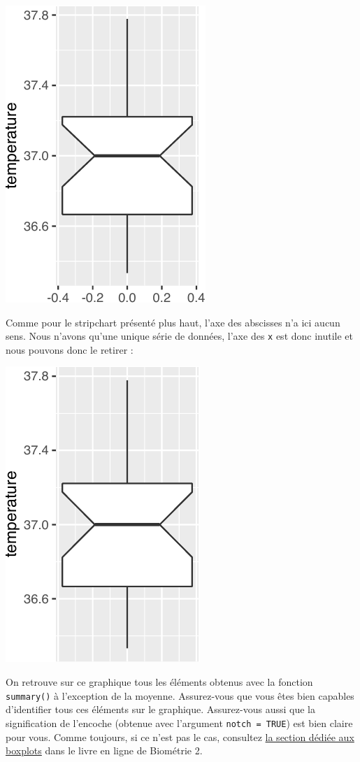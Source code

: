\documentclass[
  a4paper,
]{article}
\newenvironment{Shaded}{\begin{snugshade}}{\end{snugshade}}
\newcommand{\DataTypeTok}[1]{\textcolor[rgb]{0.00,0.34,0.68}{#1}}
\newcommand{\KeywordTok}[1]{\textcolor[rgb]{0.12,0.11,0.11}{\textbf{#1}}}
\newcommand{\NormalTok}[1]{\textcolor[rgb]{0.12,0.11,0.11}{#1}}
\newcommand{\OperatorTok}[1]{\textcolor[rgb]{0.12,0.11,0.11}{#1}}
\newcommand{\OtherTok}[1]{\textcolor[rgb]{0.00,0.43,0.16}{#1}}
\newcommand{\StringTok}[1]{\textcolor[rgb]{0.75,0.01,0.01}{#1}}
\begin{document}
\begin{center}\includegraphics[width=0.25\linewidth]{figure/unnamed-chunk-19-1} \end{center}

Comme pour le stripchart présenté plus haut, l'axe des abscisses n'a ici aucun sens. Nous n'avons qu'une unique série de données, l'axe des \texttt{x} est donc inutile et nous pouvons donc le retirer :

\begin{Shaded}
\end{Shaded}

\begin{center}\includegraphics[width=0.25\linewidth]{figure/unnamed-chunk-20-1} \end{center}

On retrouve sur ce graphique tous les éléments obtenus avec la fonction \texttt{summary()} à l'exception de la moyenne. Assurez-vous que vous êtes bien capables d'identifier tous ces éléments sur le graphique. Assurez-vous aussi que la signification de l'encoche (obtenue avec l'argument \texttt{notch\ =\ TRUE}) est bien claire pour vous. Comme toujours, si ce n'est pas le cas, consultez \href{https://besibo.github.io/DA/viz.html\#les-boites-a-moustaches-ou-boxplots}{la section dédiée aux boxplots} dans le livre en ligne de Biométrie 2.
\end{document}

